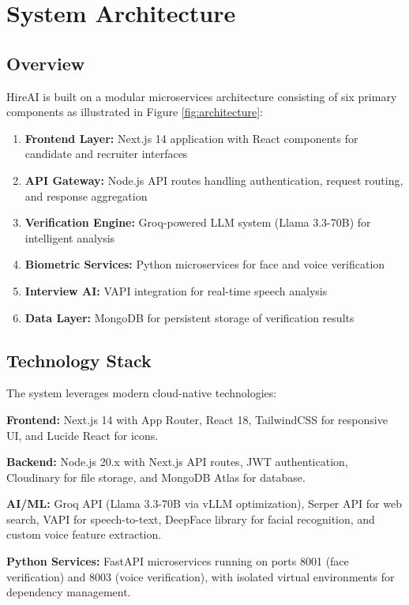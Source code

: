 \documentclass[journal]{IEEEtran}
\begin{document}
\section{System Architecture}

\subsection{Overview}
HireAI is built on a modular microservices architecture consisting of six primary components as illustrated in Figure \ref{fig:architecture}:

\begin{enumerate}
\item \textbf{Frontend Layer:} Next.js 14 application with React components for candidate and recruiter interfaces
\item \textbf{API Gateway:} Node.js API routes handling authentication, request routing, and response aggregation
\item \textbf{Verification Engine:} Groq-powered LLM system (Llama 3.3-70B) for intelligent analysis
\item \textbf{Biometric Services:} Python microservices for face and voice verification
\item \textbf{Interview AI:} VAPI integration for real-time speech analysis
\item \textbf{Data Layer:} MongoDB for persistent storage of verification results
\end{enumerate}

\subsection{Technology Stack}
The system leverages modern cloud-native technologies:

\textbf{Frontend:} Next.js 14 with App Router, React 18, TailwindCSS for responsive UI, and Lucide React for icons.

\textbf{Backend:} Node.js 20.x with Next.js API routes, JWT authentication, Cloudinary for file storage, and MongoDB Atlas for database.

\textbf{AI/ML:} Groq API (Llama 3.3-70B via vLLM optimization), Serper API for web search, VAPI for speech-to-text, DeepFace library for facial recognition, and custom voice feature extraction.

\textbf{Python Services:} FastAPI microservices running on ports 8001 (face verification) and 8003 (voice verification), with isolated virtual environments for dependency management.
\end{document}
